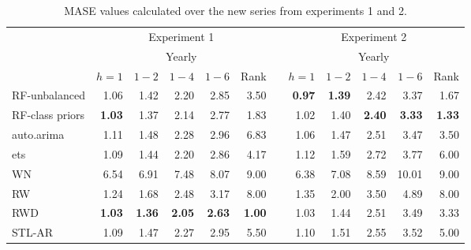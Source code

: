 \documentclass[11pt,a4paper,]{article}
\theoremstyle{definition}
\theoremstyle{definition}
\theoremstyle{definition}
\theoremstyle{remark}
\begin{document}
\begin{table}[!htbp]
\centering\footnotesize
\centering
\caption{MASE values calculated over the new series from experiments 1 and 2.}
\label{masetab}
\begin{tabular}{lrrrrrrrrrrr}
\toprule
                     &                              \multicolumn{ 5}{c}{Experiment 1} &            &                              \multicolumn{ 5}{c}{Experiment 2} \\\cmidrule(lr){2-6} \cmidrule(lr){8-12}
                     &                                    \multicolumn{ 5}{c}{Yearly} &            &                                    \multicolumn{ 5}{c}{Yearly} \\
                     &   $h=1$    &    $1-2$   &     $1-4$  &     $1-6$  &      Rank  &            &     $h=1$  &    $1-2$   &     $1-4$  &     $1-6$  &   Rank \\\cmidrule(lr){2-6} \cmidrule(lr){8-12}
RF-unbalanced        &       1.06 &       1.42 &       2.20 &       2.85 &       3.50 &            & {\bf 0.97} & {\bf 1.39} &       2.42 &       3.37 &       1.67 \\
RF-class priors      & {\bf 1.03} &       1.37 &       2.14 &       2.77 &       1.83 &            &       1.02 &       1.40 & {\bf 2.40} & {\bf 3.33} & {\bf 1.33} \\
auto.arima           &       1.11 &       1.48 &       2.28 &       2.96 &       6.83 &            &       1.06 &       1.47 &       2.51 &       3.47 &       3.50 \\
ets                  &       1.09 &       1.44 &       2.20 &       2.86 &       4.17 &            &       1.12 &       1.59 &       2.72 &       3.77 &       6.00 \\
WN                   &       6.54 &       6.91 &       7.48 &       8.07 &       9.00 &            &       6.38 &       7.08 &       8.59 &      10.01 &       9.00 \\
RW                   &       1.24 &       1.68 &       2.48 &       3.17 &       8.00 &            &       1.35 &       2.00 &       3.50 &       4.89 &       8.00 \\
RWD                  & {\bf 1.03} & {\bf 1.36} & {\bf 2.05} & {\bf 2.63} & {\bf 1.00} &            &       1.03 &       1.44 &       2.51 &       3.49 &       3.33 \\
STL-AR               &       1.09 &       1.47 &       2.27 &       2.95 &       5.50 &            &       1.10 &       1.51 &       2.55 &       3.52 &       5.00 \\

\end{tabular}
\end{table}
\end{document}
